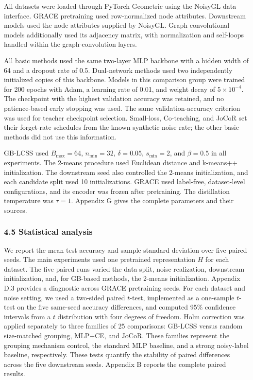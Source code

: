 All datasets were loaded through PyTorch Geometric using the NoisyGL data interface. GRACE pretraining used row-normalized node attributes. Downstream models used the node attributes supplied by NoisyGL. Graph-convolutional models additionally used its adjacency matrix, with normalization and self-loops handled within the graph-convolution layers.

All basic methods used the same two-layer MLP backbone with a hidden width of 64 and a dropout rate of 0.5. Dual-network methods used two independently initialized copies of this backbone. Models in this comparison group were trained for 200 epochs with Adam, a learning rate of 0.01, and weight decay of \(5 \times 10^{- 4}\). The checkpoint with the highest validation accuracy was retained, and no patience-based early stopping was used. The same validation-accuracy criterion was used for teacher checkpoint selection. Small-loss, Co-teaching, and JoCoR set their forget-rate schedules from the known synthetic noise rate; the other basic methods did not use this information.

GB-LCSS used \(B_{\max} = 64\), \(n_{\min} = 32\), \(\delta = 0.05\), \(s_{\min} = 2\), and \(\beta = 0.5\) in all experiments. The 2-means procedure used Euclidean distance and k-means++ initialization. The downstream seed also controlled the 2-means initialization, and each candidate split used 10 initializations. GRACE used label-free, dataset-level configurations, and its encoder was frozen after pretraining. The distillation temperature was \(\tau = 1\). Appendix G gives the complete parameters and their sources.

\subsubsection{4.5 Statistical analysis}\label{statistical-analysis}

We report the mean test accuracy and sample standard deviation over five paired seeds. The main experiments used one pretrained representation \(H\) for each dataset. The five paired runs varied the data split, noise realization, downstream initialization, and, for GB-based methods, the 2-means initialization. Appendix D.3 provides a diagnostic across GRACE pretraining seeds. For each dataset and noise setting, we used a two-sided paired \(t\)-test, implemented as a one-sample \(t\)-test on the five same-seed accuracy differences, and computed 95\% confidence intervals from a \(t\) distribution with four degrees of freedom. Holm correction was applied separately to three families of 25 comparisons: GB-LCSS versus random size-matched grouping, MLP+CE, and JoCoR. These families represent the grouping mechanism control, the standard MLP baseline, and a strong noisy-label baseline, respectively. These tests quantify the stability of paired differences across the five downstream seeds. Appendix B reports the complete paired results.

